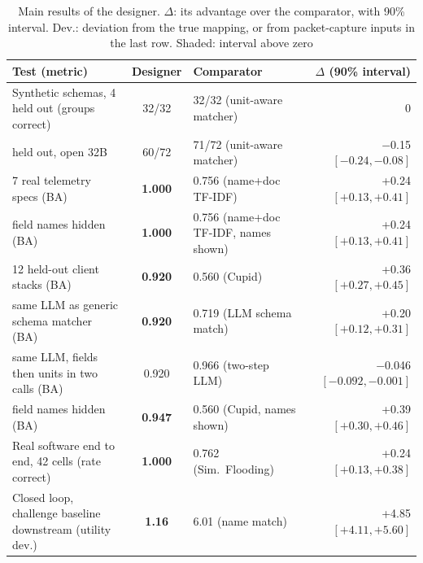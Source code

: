 \begin{table}[t]
\centering
\begin{threeparttable}
\caption{Main results of the designer. $\Delta$: its advantage over the comparator, with 90\% interval. Dev.: deviation from the true mapping, or from packet-capture inputs in the last row. Shaded: interval above zero}
\label{tab:designer}
\footnotesize
\setlength{\tabcolsep}{4pt}
\begin{tabular}{@{}l c l r@{}}
\toprule
Test (metric) & Designer & Comparator & $\Delta$ (90\% interval) \\
\midrule
Synthetic schemas, 4 held out (groups correct) & 32/32 & 32/32 (unit-aware matcher) & 0 \\
\quad 9 held out, open 32B & 60/72 & 71/72 (unit-aware matcher) & $-$0.15 $[-0.24, -0.08]$ \\
7 real telemetry specs (BA) & \cellcolor{favour}\bfseries 1.000 & 0.756 (name+doc TF-IDF) & +0.24 $[+0.13, +0.41]$ \\
\quad field names hidden (BA) & \cellcolor{favour}\bfseries 1.000 & 0.756 (name+doc TF-IDF, names shown) & +0.24 $[+0.13, +0.41]$ \\
12 held-out client stacks (BA) & \cellcolor{favour}\bfseries 0.920 & 0.560 (Cupid) & +0.36 $[+0.27, +0.45]$ \\
\quad same LLM as generic schema matcher (BA) & \cellcolor{favour}\bfseries 0.920 & 0.719 (LLM schema match) & +0.20 $[+0.12, +0.31]$ \\
\quad same LLM, fields then units in two calls (BA) & 0.920 & 0.966 (two-step LLM) & $-$0.046 $[-0.092, -0.001]$ \\
\quad field names hidden (BA) & \cellcolor{favour}\bfseries 0.947 & 0.560 (Cupid, names shown) & +0.39 $[+0.30, +0.46]$ \\
Real software end to end, 42 cells (rate correct) & \cellcolor{favour}\bfseries 1.000 & 0.762 (Sim.\ Flooding) & +0.24 $[+0.13, +0.38]$ \\
Closed loop, challenge baseline downstream (utility dev.) & \cellcolor{favour}\bfseries 1.16 & 6.01 (name match) & +4.85 $[+4.11, +5.60]$ \\

\end{tabular}
\end{threeparttable}
\end{table}
